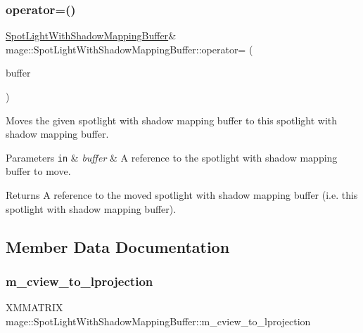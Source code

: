 \subsubsection{\texorpdfstring{operator=()}{operator=()}\hspace{0.1cm}{\footnotesize\ttfamily [2/2]}}
{\footnotesize\ttfamily \hyperlink{structmage_1_1_spot_light_with_shadow_mapping_buffer}{Spot\+Light\+With\+Shadow\+Mapping\+Buffer}\& mage\+::\+Spot\+Light\+With\+Shadow\+Mapping\+Buffer\+::operator= (\begin{DoxyParamCaption}\item[{\hyperlink{structmage_1_1_spot_light_with_shadow_mapping_buffer}{Spot\+Light\+With\+Shadow\+Mapping\+Buffer} \&\&}]{buffer }\end{DoxyParamCaption})\hspace{0.3cm}{\ttfamily [default]}}

Moves the given spotlight with shadow mapping buffer to this spotlight with shadow mapping buffer.


\begin{DoxyParams}[1]{Parameters}
\mbox{\tt in}  & {\em buffer} & A reference to the spotlight with shadow mapping buffer to move. \\
\hline
\end{DoxyParams}
\begin{DoxyReturn}{Returns}
A reference to the moved spotlight with shadow mapping buffer (i.\+e. this spotlight with shadow mapping buffer). 
\end{DoxyReturn}


\subsection{Member Data Documentation}
\hypertarget{structmage_1_1_spot_light_with_shadow_mapping_buffer_a9f265c3662e441dc1d32dd793198ca5f}{}\label{structmage_1_1_spot_light_with_shadow_mapping_buffer_a9f265c3662e441dc1d32dd793198ca5f} 
\subsubsection{\texorpdfstring{m\+\_\+cview\+\_\+to\+\_\+lprojection}{m\_cview\_to\_lprojection}}
{\footnotesize\ttfamily X\+M\+M\+A\+T\+R\+IX mage\+::\+Spot\+Light\+With\+Shadow\+Mapping\+Buffer\+::m\+\_\+cview\+\_\+to\+\_\+lprojection}

